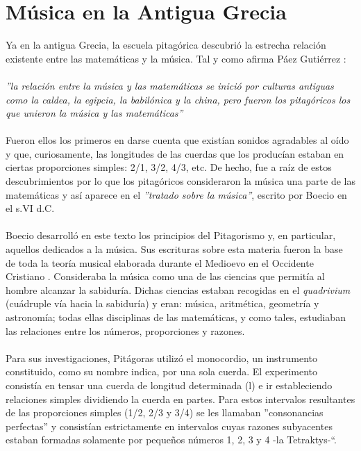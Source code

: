 \documentclass[a4paper, openright, 11pt, titlepage]{report}
\theoremstyle{definition}\newtheorem{defin}[propo]{Definition}
\theoremstyle{definition}\newtheorem{obser}[propo]{Remark}
\theoremstyle{definition}\newtheorem{ejem}[propo]{Ejemplo}
\theoremstyle{definition}\newtheorem{algoritmo}[propo]{Algoritmo}
\begin{document}
\chapter{Música en la Antigua Grecia}
Ya en la antigua Grecia, la escuela pitagórica descubrió la estrecha relación existente entre las matemáticas y la música. Tal y como afirma Páez Gutiérrez \cite{paez}:\\\\
\textit{''la relación entre la música y las matemáticas se inició por culturas antiguas como la caldea, la egipcia, la babilónica y la china, pero fueron los pitagóricos los que unieron la música y las matemáticas''}\\\\
Fueron ellos los primeros en darse cuenta que existían sonidos agradables al oído y que, curiosamente, las longitudes de las cuerdas que los producían estaban en ciertas proporciones simples: 2/1, 3/2, 4/3, etc. De hecho, fue a raíz de estos descubrimientos por lo que los pitagóricos consideraron la música una parte de las matemáticas y así aparece en el \textit{''tratado sobre la música''}, escrito por Boecio en el s.VI d.C.\\\\
Boecio desarrolló en este texto los principios del Pitagorismo y, en particular, aquellos dedicados a la música. Sus escrituras sobre esta materia fueron la base de toda la teoría musical elaborada durante el Medioevo en el Occidente Cristiano \cite{tomasini}. Consideraba la música como una de las ciencias que permitía al hombre alcanzar la sabiduría. Dichas ciencias estaban recogidas en el \textit{quadrivium} (cuádruple vía hacia la sabiduría) y eran: música, aritmética, geometría y astronomía; todas ellas disciplinas de las matemáticas, y como tales, estudiaban las relaciones entre los números, proporciones y razones.\\\\
Para sus investigaciones, Pitágoras utilizó el monocordio, un instrumento constituido, como su nombre indica, por una sola cuerda. El experimento consistía en tensar una cuerda de longitud determinada (l) e ir estableciendo relaciones simples dividiendo la cuerda en partes. Para estos intervalos resultantes de las proporciones simples (1/2, 2/3 y 3/4) se les llamaban ''consonancias perfectas'' y consistían estrictamente en intervalos cuyas razones subyacentes estaban formadas solamente por pequeños números 1, 2, 3 y 4 -la Tetraktys-“. \cite{abd}\\\\
\end{document}
